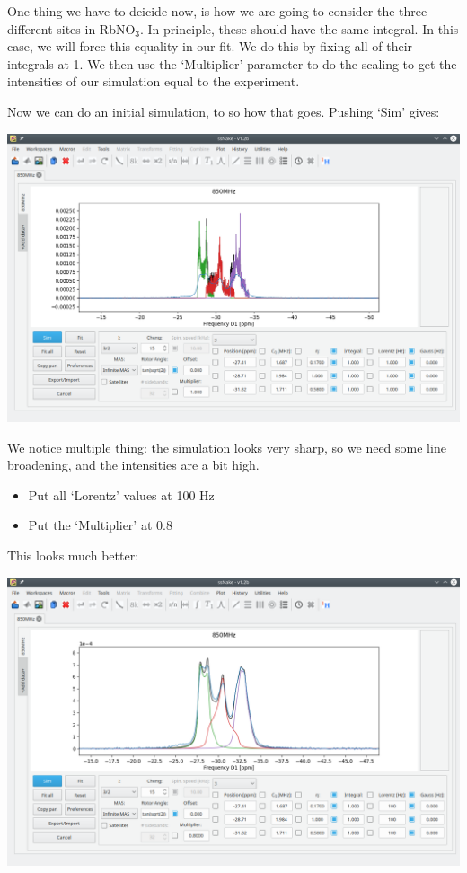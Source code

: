 \documentclass[11pt,a4paper]{article}
\begin{document}
One thing we have to deicide now, is how we are going to consider the three different sites in
RbNO$_3$. In principle, these should have the same integral. In this case, we will force this
equality in our fit. We do this by fixing all of their integrals at 1. We then use the `Multiplier'
parameter to do the scaling to get the intensities of our simulation equal to the experiment.

Now we can do an initial simulation, to so how that goes. Pushing `Sim' gives:
\begin{center}
\includegraphics[width=1.0\linewidth]{Figs/Fig5.png}
\end{center}
We notice multiple thing: the simulation looks very sharp, so we need some line broadening, and the
intensities are a bit high.
\begin{itemize}
  \item Put all `Lorentz' values at 100 Hz
  \item Put the `Multiplier' at 0.8
\end{itemize}
This looks much better:
\begin{center}
\includegraphics[width=1.0\linewidth]{Figs/Fig6.png}
\end{center}
\end{document}
